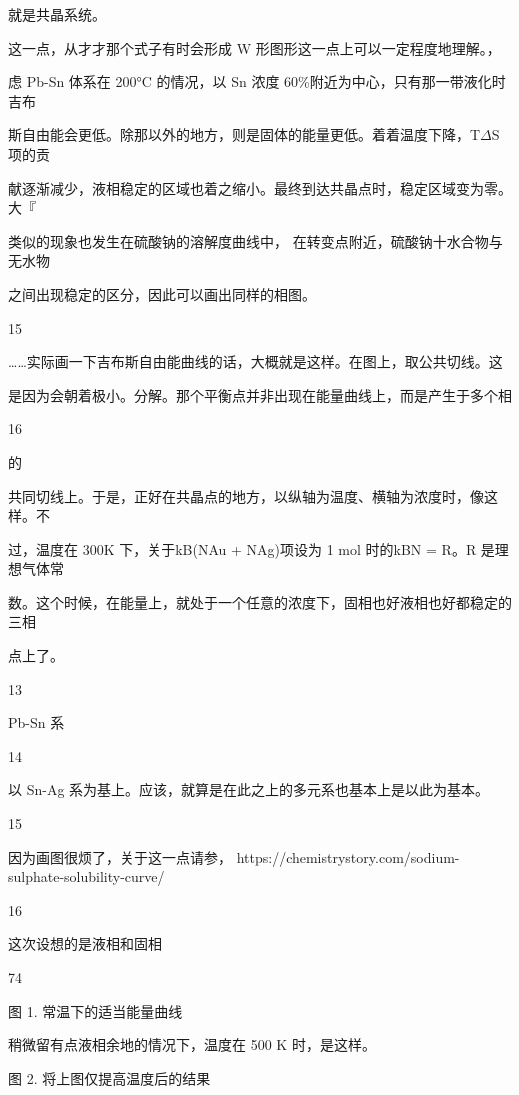 就是共晶系统。\par
这一点，从才才那个式子有时会形成 W 形图形这一点上可以一定程度地理解。，\par
虑 Pb-Sn 体系在 200°C 的情况，以 Sn 浓度 60\%附近为中心，只有那一带液化时吉布\par
斯自由能会更低。除那以外的地方，则是固体的能量更低。着着温度下降，T$\Delta$S项的贡\par
献逐渐减少，液相稳定的区域也着之缩小。最终到达共晶点时，稳定区域变为零。大『\par
类似的现象也发生在硫酸钠的溶解度曲线中， 在转变点附近，硫酸钠十水合物与无水物\par
之间出现稳定的区分，因此可以画出同样的相图。\par
15\par
……实际画一下吉布斯自由能曲线的话，大概就是这样。在图上，取公共切线。这\par
是因为会朝着极小。分解。那个平衡点并非出现在能量曲线上，而是产生于多个相\par
16\par
的\par
共同切线上。于是，正好在共晶点的地方，以纵轴为温度、横轴为浓度时，像这样。不\par
过，温度在 300K 下，关于kB(NAu + NAg)项设为 1 mol 时的kBN = R。R 是理想气体常\par
数。这个时候，在能量上，就处于一个任意的浓度下，固相也好液相也好都稳定的三相\par
点上了。\par
13\par
Pb-Sn 系\par
14\par
以 Sn-Ag 系为基上。应该，就算是在此之上的多元系也基本上是以此为基本。\par
15\par
因为画图很烦了，关于这一点请参， https://chemistrystory.com/sodium-sulphate-solubility-curve/\par
16\par
这次设想的是液相和固相\par

74\par
图 1. 常温下的适当能量曲线\par
稍微留有点液相余地的情况下，温度在 500 K 时，是这样。\par
图 2. 将上图仅提高温度后的结果\par

